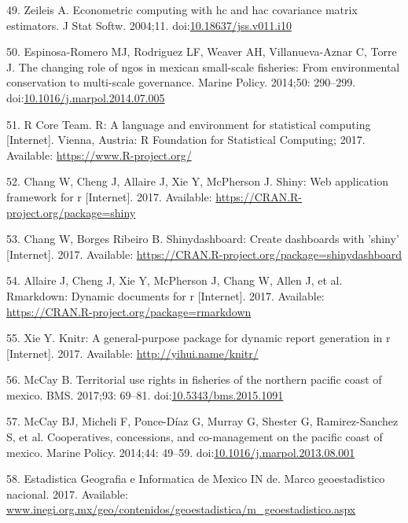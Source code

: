 \documentclass[12pt,]{article}
\begin{document}
\hypertarget{ref-zeileis_2004-7n}{}
49. Zeileis A. Econometric computing with hc and hac covariance matrix
estimators. J Stat Softw. 2004;11.
doi:\href{https://doi.org/10.18637/jss.v011.i10}{10.18637/jss.v011.i10}

\hypertarget{ref-espinosaromero_2014-PY}{}
50. Espinosa-Romero MJ, Rodriguez LF, Weaver AH, Villanueva-Aznar C,
Torre J. The changing role of ngos in mexican small-scale fisheries:
From environmental conservation to multi-scale governance. Marine
Policy. 2014;50: 290--299.
doi:\href{https://doi.org/10.1016/j.marpol.2014.07.005}{10.1016/j.marpol.2014.07.005}

\hypertarget{ref-rcore_2017}{}
51. R Core Team. R: A language and environment for statistical computing
{[}Internet{]}. Vienna, Austria: R Foundation for Statistical Computing;
2017. Available: \url{https://www.R-project.org/}

\hypertarget{ref-shiny_2017}{}
52. Chang W, Cheng J, Allaire J, Xie Y, McPherson J. Shiny: Web
application framework for r {[}Internet{]}. 2017. Available:
\url{https://CRAN.R-project.org/package=shiny}

\hypertarget{ref-shinydashboard_2017}{}
53. Chang W, Borges Ribeiro B. Shinydashboard: Create dashboards with
'shiny' {[}Internet{]}. 2017. Available:
\url{https://CRAN.R-project.org/package=shinydashboard}

\hypertarget{ref-rmarkdown_2017}{}
54. Allaire J, Cheng J, Xie Y, McPherson J, Chang W, Allen J, et al.
Rmarkdown: Dynamic documents for r {[}Internet{]}. 2017. Available:
\url{https://CRAN.R-project.org/package=rmarkdown}

\hypertarget{ref-knitr_2017}{}
55. Xie Y. Knitr: A general-purpose package for dynamic report
generation in r {[}Internet{]}. 2017. Available:
\url{http://yihui.name/knitr/}

\hypertarget{ref-mccay_2017-1m}{}
56. McCay B. Territorial use rights in fisheries of the northern pacific
coast of mexico. BMS. 2017;93: 69--81.
doi:\href{https://doi.org/10.5343/bms.2015.1091}{10.5343/bms.2015.1091}

\hypertarget{ref-mccay_2014-CN}{}
57. McCay BJ, Micheli F, Ponce-Díaz G, Murray G, Shester G,
Ramirez-Sanchez S, et al. Cooperatives, concessions, and co-management
on the pacific coast of mexico. Marine Policy. 2014;44: 49--59.
doi:\href{https://doi.org/10.1016/j.marpol.2013.08.001}{10.1016/j.marpol.2013.08.001}

\hypertarget{ref-INEGI}{}
58. Estadistica Geografia e Informatica de Mexico IN de. Marco
geoestadistico nacional. 2017. Available:
\url{www.inegi.org.mx/geo/contenidos/geoestadistica/m_geoestadistico.aspx}
\end{document}
